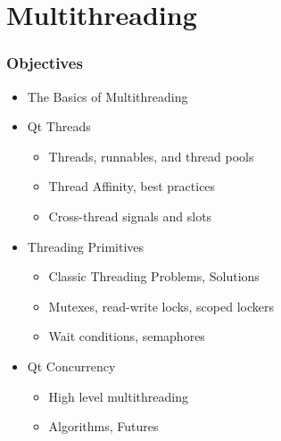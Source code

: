 %
%
%
%

\section{Multithreading}
\begin{slide}[fragile]
\frametitle{Objectives}
\begin{itemize}
\item The Basics of Multithreading
\item Qt Threads
    \begin{itemize}
    \item Threads, runnables, and thread pools
    \item Thread Affinity, best practices
    \item Cross-thread signals and slots
    \end{itemize}
\item Threading Primitives
    \begin{itemize}
    \item Classic Threading Problems, Solutions
    \item Mutexes, read-write locks, scoped lockers 
    \item Wait conditions, semaphores
    \end{itemize}
\item Qt Concurrency
    \begin{itemize}
    \item High level multithreading
    \item Algorithms, Futures
    \end{itemize}
\end{itemize}
\end{slide}




